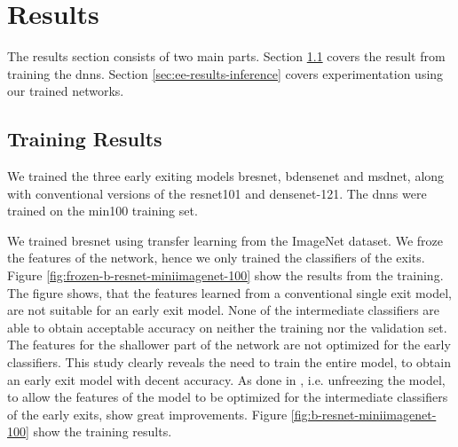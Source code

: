 \section{Results} \label{sec:ee-results}

The results section consists of two main parts. Section \ref{sec:ee-results-training} covers the result from training the \gls{dnn}s. Section \ref{sec:ee-results-inference} covers experimentation using our trained networks. 

\subsection{Training Results} \label{sec:ee-results-training}

We trained the three early exiting models \gls{bresnet}, \gls{bdensenet} and \gls{msdnet}, along with conventional versions of the \gls{resnet}101 and \gls{densenet}-121. The \gls{dnn}s were trained on the \gls{min100} training set.

We trained \gls{bresnet} using transfer learning from the ImageNet dataset. We froze the features of the network, hence we only trained the classifiers of the exits. Figure \ref{fig:frozen-b-resnet-miniimagenet-100} show the results from the training. The figure shows, that the features learned from a conventional single exit model, are not suitable for an early exit model. None of the intermediate classifiers are able to obtain acceptable accuracy on neither the training nor the validation set. The features for the shallower part of the network are not optimized for the early classifiers. This study clearly reveals the need to train the entire model, to obtain an early exit model with decent accuracy. As done in \cite{teerapittayanon_branchynet:_2016}, i.e. unfreezing the model, to allow the features of the model to be optimized for the intermediate classifiers of the early exits, show great improvements. Figure \ref{fig:b-resnet-miniimagenet-100} show the training results.

